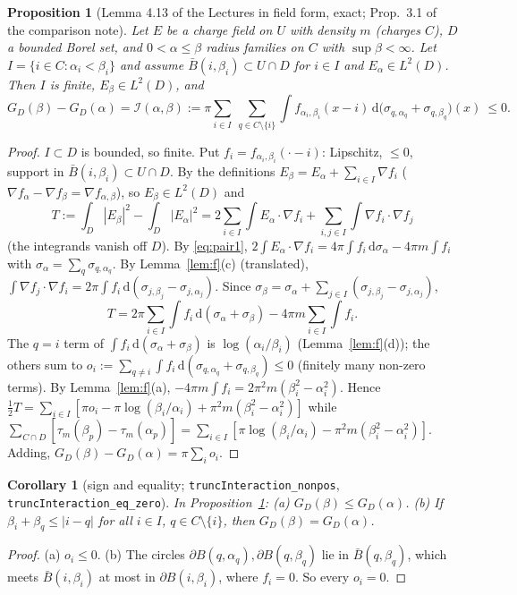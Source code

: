 \documentclass[11pt]{article}
\newtheorem{proposition}[theorem]{Proposition}
\newtheorem{corollary}[theorem]{Corollary}
\theoremstyle{definition}
\theoremstyle{remark}
\newcommand{\dd}{\,\mathrm d}
\begin{document}
\begin{proposition}[Lemma 4.13 of the Lectures in field form, exact; Prop.~3.1 of the comparison note]\label{prop:mono}
Let $E$ be a charge field on $U$ with density $m$ (charges $C$), $D$ a bounded Borel set, and $0<\alpha\le\beta$ radius families
on $C$ with $\sup\beta<\infty$. Let $I=\{i\in C:\alpha_i<\beta_i\}$ and assume $\bar B(i,\beta_i)\subset U\cap D$ for $i\in I$ and
$E_\alpha\in L^2(D)$. Then $I$ is finite, $E_\beta\in L^2(D)$, and
\begin{equation}\label{eq:mono}
G_D(\beta)-G_D(\alpha)=\mathcal I(\alpha,\beta):=\pi\sum_{i\in I}\ \sum_{q\in C\setminus\{i\}}\int f_{\alpha_i,\beta_i}(x-i)\dd\bigl(\sigma_{q,\alpha_q}+\sigma_{q,\beta_q}\bigr)(x)\ \le 0 .
\end{equation}
\end{proposition}
\begin{proof}
$I\subset D$ is bounded, so finite. Put $f_i=f_{\alpha_i,\beta_i}(\cdot-i)$: Lipschitz, $\le0$, support in $\bar B(i,\beta_i)\subset U\cap D$. By the definitions
$E_\beta=E_\alpha+\sum_{i\in I}\nabla f_i$ ($\nabla f_\alpha-\nabla f_\beta=\nabla f_{\alpha,\beta}$), so $E_\beta\in L^2(D)$ and
\[
T:=\int_D|E_\beta|^2-\int_D|E_\alpha|^2=2\sum_{i\in I}\int E_\alpha\cdot\nabla f_i+\sum_{i,j\in I}\int\nabla f_i\cdot\nabla f_j
\]
(the integrands vanish off $D$). By \eqref{eq:pair1}, $2\int E_\alpha\cdot\nabla f_i=4\pi\int f_i\dd\sigma_\alpha-4\pi m\int f_i$ with
$\sigma_\alpha=\sum_q\sigma_{q,\alpha_q}$. By Lemma~\ref{lem:f}(c) (translated),
$\int\nabla f_j\cdot\nabla f_i=2\pi\int f_i\dd(\sigma_{j,\beta_j}-\sigma_{j,\alpha_j})$. Since $\sigma_\beta=\sigma_\alpha+\sum_{j\in I}(\sigma_{j,\beta_j}-\sigma_{j,\alpha_j})$,
\[
T=2\pi\sum_{i\in I}\int f_i\dd(\sigma_\alpha+\sigma_\beta)-4\pi m\sum_{i\in I}\int f_i .
\]
The $q=i$ term of $\int f_i\dd(\sigma_\alpha+\sigma_\beta)$ is $\log(\alpha_i/\beta_i)$ (Lemma~\ref{lem:f}(d)); the others sum to
$o_i:=\sum_{q\ne i}\int f_i\dd(\sigma_{q,\alpha_q}+\sigma_{q,\beta_q})\le0$ (finitely many non-zero terms). By Lemma~\ref{lem:f}(a),
$-4\pi m\int f_i=2\pi^2m(\beta_i^2-\alpha_i^2)$. Hence $\frac12T=\sum_{i\in I}[\pi o_i-\pi\log(\beta_i/\alpha_i)+\pi^2m(\beta_i^2-\alpha_i^2)]$ while
$\sum_{C\cap D}[\tau_m(\beta_p)-\tau_m(\alpha_p)]=\sum_{i\in I}[\pi\log(\beta_i/\alpha_i)-\pi^2m(\beta_i^2-\alpha_i^2)]$.
Adding, $G_D(\beta)-G_D(\alpha)=\pi\sum_io_i$.
\end{proof}

\begin{corollary}[sign and equality; \texttt{truncInteraction\_nonpos}, \texttt{truncInteraction\_eq\_zero}]\label{cor:mono}
In Proposition~\ref{prop:mono}: (a) $G_D(\beta)\le G_D(\alpha)$. (b) If $\beta_i+\beta_q\le|i-q|$ for all $i\in I$, $q\in C\setminus\{i\}$, then
$G_D(\beta)=G_D(\alpha)$.
\end{corollary}
\begin{proof}
(a) $o_i\le0$. (b) The circles $\partial B(q,\alpha_q),\partial B(q,\beta_q)$ lie in $\bar B(q,\beta_q)$, which meets $\bar B(i,\beta_i)$ at most in
$\partial B(i,\beta_i)$, where $f_i=0$. So every $o_i=0$.
\end{proof}
\end{document}

